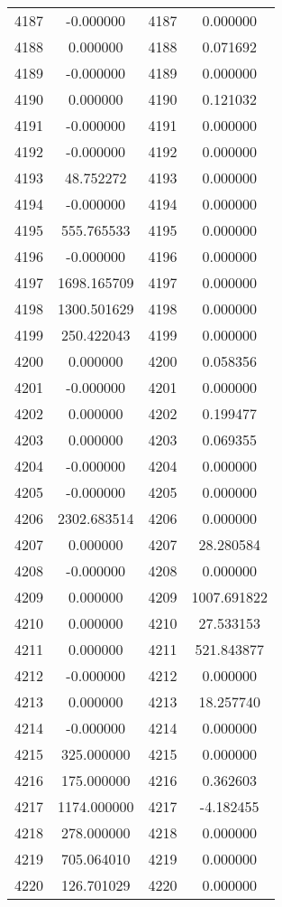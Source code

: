 \documentclass[12pt]{article}
\begin{document}
\begin{longtable}{@{}cccc@{}}
4187 & -0.000000 & 4187 & 0.000000 \\
4188 & 0.000000 & 4188 & 0.071692 \\
4189 & -0.000000 & 4189 & 0.000000 \\
4190 & 0.000000 & 4190 & 0.121032 \\
4191 & -0.000000 & 4191 & 0.000000 \\
4192 & -0.000000 & 4192 & 0.000000 \\
4193 & 48.752272 & 4193 & 0.000000 \\
4194 & -0.000000 & 4194 & 0.000000 \\
4195 & 555.765533 & 4195 & 0.000000 \\
4196 & -0.000000 & 4196 & 0.000000 \\
4197 & 1698.165709 & 4197 & 0.000000 \\
4198 & 1300.501629 & 4198 & 0.000000 \\
4199 & 250.422043 & 4199 & 0.000000 \\
4200 & 0.000000 & 4200 & 0.058356 \\
4201 & -0.000000 & 4201 & 0.000000 \\
4202 & 0.000000 & 4202 & 0.199477 \\
4203 & 0.000000 & 4203 & 0.069355 \\
4204 & -0.000000 & 4204 & 0.000000 \\
4205 & -0.000000 & 4205 & 0.000000 \\
4206 & 2302.683514 & 4206 & 0.000000 \\
4207 & 0.000000 & 4207 & 28.280584 \\
4208 & -0.000000 & 4208 & 0.000000 \\
4209 & 0.000000 & 4209 & 1007.691822 \\
4210 & 0.000000 & 4210 & 27.533153 \\
4211 & 0.000000 & 4211 & 521.843877 \\
4212 & -0.000000 & 4212 & 0.000000 \\
4213 & 0.000000 & 4213 & 18.257740 \\
4214 & -0.000000 & 4214 & 0.000000 \\
4215 & 325.000000 & 4215 & 0.000000 \\
4216 & 175.000000 & 4216 & 0.362603 \\
4217 & 1174.000000 & 4217 & -4.182455 \\
4218 & 278.000000 & 4218 & 0.000000 \\
4219 & 705.064010 & 4219 & 0.000000 \\
4220 & 126.701029 & 4220 & 0.000000 \\

\end{longtable}
\end{document}
